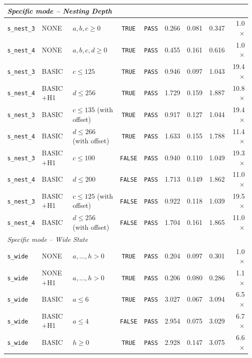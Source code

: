 {\begin{longtable}{p{} p{} p{} c c r r r r}
\multicolumn{9}{l}{\textit{Specific mode -- Nesting Depth}} \\
\midrule
\texttt{s\_nest\_3} & NONE & $a,b,c \geq 0$ & \texttt{TRUE} & \texttt{PASS} & 0.266 & 0.081 & 0.347 & 1.0$\times$ \\
\texttt{s\_nest\_4} & NONE & $a,b,c,d \geq 0$ & \texttt{TRUE} & \texttt{PASS} & 0.455 & 0.161 & 0.616 & 1.0$\times$ \\
\texttt{s\_nest\_3} & BASIC & $c \leq 125$ & \texttt{TRUE} & \texttt{PASS} & 0.946 & 0.097 & 1.043 & 19.4$\times$ \\
\texttt{s\_nest\_4} & BASIC$+$H1 & $d \leq 256$ & \texttt{TRUE} & \texttt{PASS} & 1.729 & 0.159 & 1.887 & 10.8$\times$ \\
\texttt{s\_nest\_3} & BASIC & $c \leq 135$ (with offset) & \texttt{TRUE} & \texttt{PASS} & 0.917 & 0.127 & 1.044 & 19.4$\times$ \\
\texttt{s\_nest\_4} & BASIC & $d \leq 266$ (with offset) & \texttt{TRUE} & \texttt{PASS} & 1.633 & 0.155 & 1.788 & 11.4$\times$ \\
\texttt{s\_nest\_3} & BASIC$+$H1 & $c \leq 100$ & \texttt{FALSE} & \texttt{PASS} & 0.940 & 0.110 & 1.049 & 19.3$\times$ \\
\texttt{s\_nest\_4} & BASIC & $d \leq 200$ & \texttt{FALSE} & \texttt{PASS} & 1.713 & 0.149 & 1.862 & 11.0$\times$ \\
\texttt{s\_nest\_3} & BASIC$+$H1 & $c \leq 125$ (with offset) & \texttt{FALSE} & \texttt{PASS} & 0.922 & 0.118 & 1.039 & 19.5$\times$ \\
\texttt{s\_nest\_4} & BASIC & $d \leq 256$ (with offset) & \texttt{FALSE} & \texttt{PASS} & 1.704 & 0.161 & 1.865 & 11.0$\times$ \\
\midrule
\multicolumn{9}{l}{\textit{Specific mode -- Wide State}} \\
\midrule
\texttt{s\_wide} & NONE & $a,{\ldots},h > 0$ & \texttt{TRUE} & \texttt{PASS} & 0.204 & 0.097 & 0.301 & 1.0$\times$ \\
\texttt{s\_wide} & NONE$+$H1 & $a,{\ldots},h > 0$ & \texttt{TRUE} & \texttt{PASS} & 0.206 & 0.080 & 0.286 & 1.1$\times$ \\
\texttt{s\_wide} & BASIC & $a \leq 6$ & \texttt{TRUE} & \texttt{PASS} & 3.027 & 0.067 & 3.094 & 6.5$\times$ \\
\texttt{s\_wide} & BASIC$+$H1 & $a \leq 4$ & \texttt{FALSE} & \texttt{PASS} & 2.954 & 0.075 & 3.029 & 6.7$\times$ \\
\texttt{s\_wide} & BASIC & $h \geq 0$ & \texttt{TRUE} & \texttt{PASS} & 2.928 & 0.147 & 3.075 & 6.6$\times$ \\

\end{longtable}}
